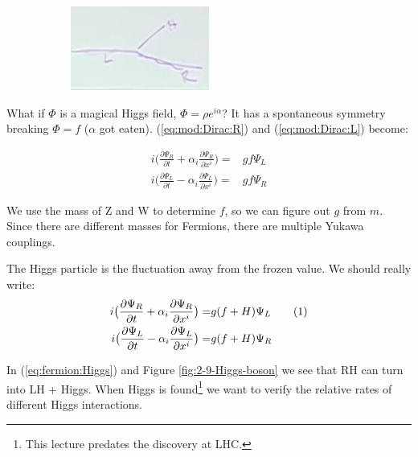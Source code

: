 \documentclass[]{article}
\newcommand\numberthis{\addtocounter{equation}{1}\tag{\theequation}}
\begin{document}
\begin{figure}[H]
\begin{subfigure}[t]{0.3\textwidth}
 	\includegraphics[width=\textwidth]{2-9-Higgs-boson}
 \end{subfigure}
 \end{figure}

What if $\Phi$ is a magical Higgs field, $\Phi=\rho e^{i\alpha}$? It has a spontaneous symmetry breaking $\Phi=f$ ($\alpha$ got eaten). (\ref{eq:mod:Dirac:R}) and (\ref{eq:mod:Dirac:L}) become:

 \begin{align*}
i \big(\frac{\partial \Psi_R}{\partial t} + \alpha_i \frac{\partial \Psi_R}{\partial 	x^i}\big) =& g f \Psi_L \\
i \big(\frac{\partial \Psi_L}{\partial t} - \alpha_i \frac{\partial \Psi_L}{\partial 	x^i}\big) =& g f \Psi_R  
\end{align*}

We use the mass of Z and W to determine $f$, so we can figure out $g$ from $m$. Since there are different masses for Fermions, there are multiple Yukawa couplings.

The Higgs particle is the fluctuation away from the frozen value. We should really write:
 \begin{align*}
i \big(\frac{\partial \Psi_R}{\partial t} + \alpha_i \frac{\partial \Psi_R}{\partial 	x^i}\big) =& g (f+H) \Psi_L  \numberthis \label{eq:fermion:Higgs}\\
i \big(\frac{\partial \Psi_L}{\partial t} - \alpha_i \frac{\partial \Psi_L}{\partial 	x^i}\big) =& g (f+H) \Psi_R  
\end{align*}

In (\ref{eq:fermion:Higgs}) and Figure \ref{fig:2-9-Higgs-boson} we see that RH can turn into LH + Higgs. When Higgs is found\footnote{This lecture predates the discovery at LHC.} we want to verify the relative rates of different Higgs interactions. 
\end{document}

